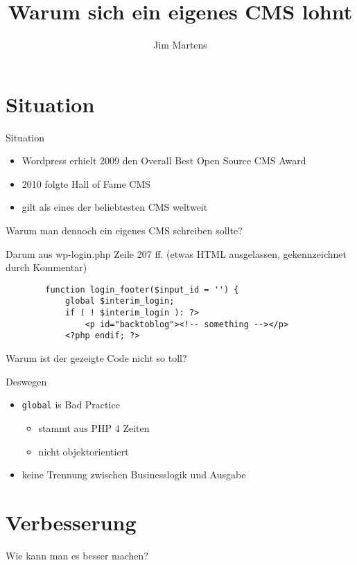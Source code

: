 \documentclass{beamer}
\begin{document}
\author{Jim Martens}
\title{Warum sich ein eigenes CMS lohnt}

\section{Situation}
\begin{frame}{Situation}
	\begin{itemize}
		\item	Wordpress erhielt 2009 den Overall Best Open Source CMS Award
		\item	2010 folgte Hall of Fame CMS
		\item	gilt als eines der beliebtesten CMS weltweit
	\end{itemize}
\end{frame}

\begin{frame}
	\centering
	Warum man dennoch ein eigenes CMS schreiben sollte?
\end{frame}

\begin{frame}[fragile]{Darum}
	aus wp-login.php Zeile 207 ff. (etwas HTML ausgelassen, gekennzeichnet durch Kommentar)
	\begin{lstlisting}
		function login_footer($input_id = '') {
		    global $interim_login;
		    if ( ! $interim_login ): ?>
			    <p id="backtoblog"><!-- something --></p>
		    <?php endif; ?>
	\end{lstlisting}
\end{frame}

\begin{frame}
	\centering	
	Warum ist der gezeigte Code nicht so toll?
\end{frame}

\begin{frame}{Deswegen}
	\begin{itemize}
		\item	\texttt{global} is Bad Practice
		\begin{itemize}		
			\item	stammt aus PHP 4 Zeiten
			\item	nicht objektorientiert
		\end{itemize}
		\item	keine Trennung zwischen Businesslogik und Ausgabe
	\end{itemize}
\end{frame}

\section{Verbesserung}
\begin{frame}
	\centering
	Wie kann man es besser machen?
\end{frame}	
\end{document}
